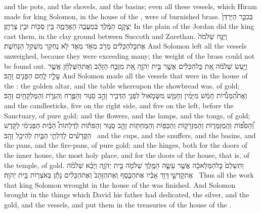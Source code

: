 {and the pots, and the shovels, and the basins; even all these vessels, which Hiram made for king Solomon, in the house of the \lord, were of burnished brass.}
{בְּכִכַּ֤ר הַיַּרְדֵּן֙ יְצָקָ֣ם הַמֶּ֔לֶךְ בְּמַעֲבֵ֖ה הָאֲדָמָ֑ה בֵּ֥ין סֻכּ֖וֹת וּבֵ֥ין צָרְתָֽן׃}
{In the plain of the Jordan did the king cast them, in the clay ground between Succoth and Zarethan.}
{וַיַּנַּ֤ח שְׁלֹמֹה֙ אֶת\maqqaf כׇּל\maqqaf הַכֵּלִ֔ים מֵרֹ֖ב מְאֹ֣ד מְאֹ֑ד לֹ֥א נֶחְקַ֖ר מִשְׁקַ֥ל הַנְּחֹֽשֶׁת׃}
{And Solomon left all the vessels unweighed, because they were exceeding many; the weight of the brass could not be found out.}
{וַיַּ֣עַשׂ שְׁלֹמֹ֔ה אֵ֚ת כׇּל\maqqaf הַכֵּלִ֔ים אֲשֶׁ֖ר בֵּ֣ית יְהֹוָ֑ה אֵ֚ת מִזְבַּ֣ח הַזָּהָ֔ב וְאֶת\maqqaf הַשֻּׁלְחָ֗ן אֲשֶׁ֥ר עָלָ֛יו לֶ֥חֶם הַפָּנִ֖ים זָהָֽב׃}
{And Solomon made all the vessels that were in the house of the \lord: the golden altar, and the table whereupon the showbread was, of gold;}
{וְאֶת\maqqaf הַ֠מְּנֹר֠וֹת חָמֵ֨שׁ מִיָּמִ֜ין וְחָמֵ֧שׁ מִשְּׂמֹ֛אול לִפְנֵ֥י הַדְּבִ֖יר זָהָ֣ב סָג֑וּר וְהַפֶּ֧רַח וְהַנֵּרֹ֛ת וְהַמֶּלְקַחַ֖יִם זָהָֽב׃}
{and the candlesticks, five on the right side, and five on the left, before the Sanctuary, of pure gold; and the flowers, and the lamps, and the tongs, of gold;}
{וְ֠הַסִּפּ֠וֹת וְהַֽמְזַמְּר֧וֹת וְהַמִּזְרָק֛וֹת וְהַכַּפּ֥וֹת וְהַמַּחְתּ֖וֹת זָהָ֣ב סָג֑וּר וְהַפֹּת֡וֹת לְדַלְתוֹת֩ הַבַּ֨יִת הַפְּנִימִ֜י לְקֹ֣דֶשׁ הַקֳּדָשִׁ֗ים לְדַלְתֵ֥י הַבַּ֛יִת לַהֵיכָ֖ל זָהָֽב׃ \petucha }
{and the cups, and the snuffers, and the basins, and the pans, and the fire-pans, of pure gold; and the hinges, both for the doors of the inner house, the most holy place, and for the doors of the house, that is, of the temple, of gold.}
\label{haft_23}
\setcounter{chap}{7}
\setcounter{verse}{51}
{וַתִּשְׁלַם֙ כׇּל\maqqaf הַמְּלָאכָ֔ה אֲשֶׁ֥ר עָשָׂ֛ה הַמֶּ֥לֶךְ שְׁלֹמֹ֖ה בֵּ֣ית יְהֹוָ֑ה וַיָּבֵ֨א שְׁלֹמֹ֜ה אֶת\maqqaf קׇדְשֵׁ֣י \legarmeh  דָּוִ֣ד אָבִ֗יו אֶת\maqqaf הַכֶּ֤סֶף וְאֶת\maqqaf הַזָּהָב֙ וְאֶת\maqqaf הַכֵּלִ֔ים נָתַ֕ן בְּאֹצְר֖וֹת בֵּ֥ית יְהֹוָֽה׃ \petucha }
{Thus all the work that king Solomon wrought in the house of the \lord\space was finished. And Solomon brought in the things which David his father had dedicated, the silver, and the gold, and the vessels, and put them in the treasuries of the house of the \lord.}
\newperek
{}
